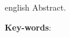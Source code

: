 \begin{resumo}[Abstract]
 \begin{otherlanguage*}{english}
   Abstract.

   \vspace{\onelineskip}
 
   \noindent 
   \textbf{Key-words}:
 \end{otherlanguage*}
\end{resumo}
